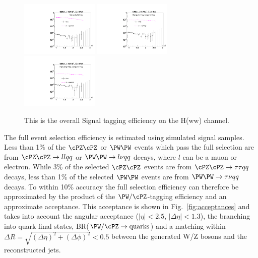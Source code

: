 \begin{figure}[htb]
\begin{center}
\includegraphics[width=0.33\textwidth]{HqqqqZqqfigs/Signal/tagging-eff-HighPuri.pdf}
\includegraphics[width=0.33\textwidth]{HqqqqZqqfigs/Signal/tagging-eff-LowPuriH.pdf}
\includegraphics[width=0.33\textwidth]{HqqqqZqqfigs/Signal/tagging-eff-LowPuriV.pdf}
\end{center}
\caption{
This is the overall Signal tagging efficiency on the H(ww) channel. 
}
\label{fig:HwwEff}
\end{figure}







\iffalse

The full event selection efficiency is estimated using simulated
signal samples.
Less than 1\% of the $\cPZ\cPZ$ or $\PW\PW$ events which pass the full
selection are from $\cPZ\cPZ \to ll qq$ or $\PW\PW \to l\nu qq$
decays, where $l$ can be a muon or electron.  While 3\% of the
selected $\cPZ\cPZ$ events are from $\cPZ\cPZ \to \tau\tau qq$ decays,
less than 1\% of the selected $\PW\PW$ events are from $\PW\PW \to
\tau\nu qq$ decays.
To within 10\% accuracy the full selection efficiency can
therefore be
approximated by the product of the $\PW/\cPZ$-tagging efficiency
and an approximate acceptance.
This acceptance is shown in Fig.~\ref{fig:acceptances} and
takes into account the angular acceptance
($|\eta| < 2.5$, $|\Delta\eta|<1.3$),
the branching into quark final states,
BR($\PW/\cPZ \to \text{quarks}$) and a matching within
$\Delta R = \sqrt{(\Delta \eta)^2 + (\Delta\phi)^2} <0.5$
between the generated W/Z bosons and the reconstructed jets.


